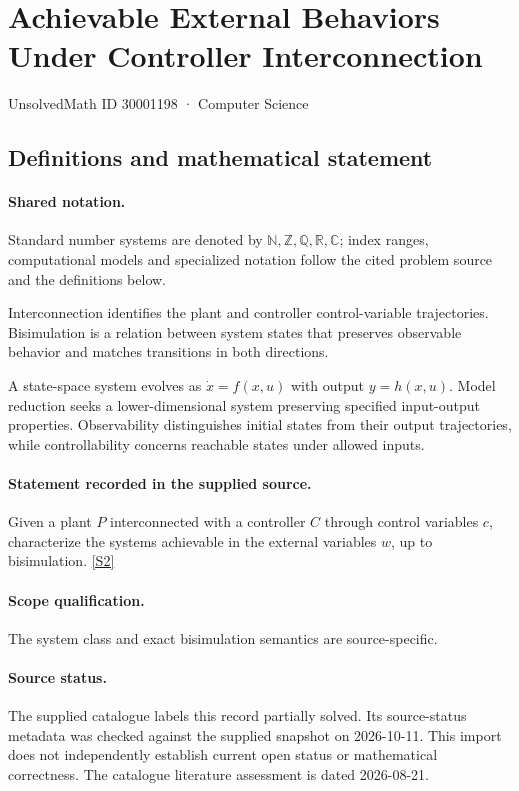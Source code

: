\documentclass[11pt]{article}
\newcommand{\sref}[2]{\hyperlink{source:#1:#2}{[S#2]}}
\begin{document}
\setcounter{section}{30001197}
\section{Achievable External Behaviors Under Controller Interconnection}\label{30001198}
{\small\sffamily UnsolvedMath ID 30001198 · Computer Science}
\subsection{Definitions and mathematical statement}

\paragraph{Shared notation.}Standard number systems are denoted by $\mathbb N,\mathbb Z,\mathbb Q,\mathbb R,\mathbb C$; index ranges, computational models and specialized notation follow the cited problem source and the definitions below.


Interconnection identifies the plant and controller control-variable trajectories. Bisimulation is a relation between system states that preserves observable behavior and matches transitions in both directions.

A state-space system evolves as $\dot x=f(x,u)$ with output $y=h(x,u)$. Model reduction seeks a lower-dimensional system preserving specified input-output properties. Observability distinguishes initial states from their output trajectories, while controllability concerns reachable states under allowed inputs.
\paragraph{Statement recorded in the supplied source.}
Given a plant $P$ interconnected with a controller $C$ through control variables $c$, characterize the systems achievable in the external variables $w$, up to bisimulation. \sref{30001198}{2}
\paragraph{Scope qualification.}
The system class and exact bisimulation semantics are source-specific.
\paragraph{Source status.}
The supplied catalogue labels this record partially solved. Its source-status metadata was checked against the supplied snapshot on 2026-10-11. This import does not independently establish current open status or mathematical correctness. The catalogue literature assessment is dated 2026-08-21.
\end{document}

